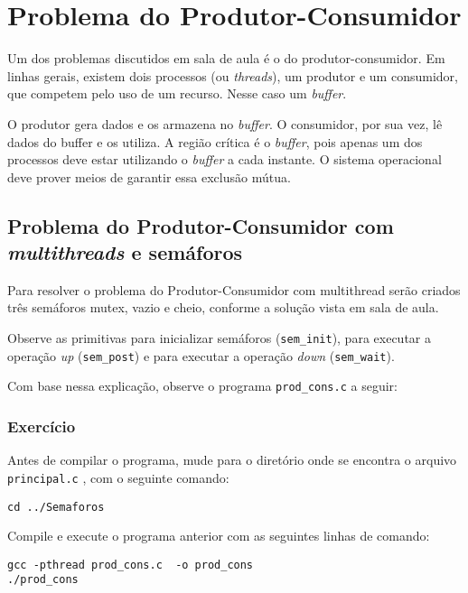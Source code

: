 \chapter{Problema do Produtor-Consumidor}
Um dos problemas discutidos em sala de aula é o do produtor-consumidor. Em linhas gerais, existem dois processos (ou \textit{threads}), um produtor e um consumidor, que competem pelo uso de um recurso. Nesse caso um \textit{buffer}.

O produtor gera dados e os armazena no \textit{buffer}. O consumidor, por sua vez, lê dados do buffer e os utiliza. A região crítica é o \textit{buffer}, pois apenas um dos processos deve estar utilizando o \textit{buffer} a cada instante. O sistema operacional deve prover meios de garantir essa exclusão mútua.


\section{Problema do Produtor-Consumidor com \textit{multithreads} e semáforos}
Para resolver o problema do Produtor-Consumidor com multithread serão criados três semáforos mutex, vazio e cheio, conforme a solução vista em sala de aula.

Observe as primitivas para inicializar semáforos (\texttt{sem\_init}), para executar a operação \textit{up} (\texttt{sem\_post}) e para executar a operação \textit{down} (\texttt{sem\_wait}).

Com base nessa explicação, observe o programa \texttt{prod\_cons.c} a seguir: 


\subsection{Exercício}
Antes de compilar o programa, mude para o diretório onde se encontra o arquivo \texttt{principal.c} , com o seguinte comando:

\begin{lstlisting}[style=MyBashStyle]
cd ../Semaforos
\end{lstlisting}

Compile e execute o programa anterior com as seguintes linhas de comando:

\begin{lstlisting}[style=MyBashStyle]
gcc -pthread prod_cons.c  -o prod_cons
./prod_cons
\end{lstlisting}